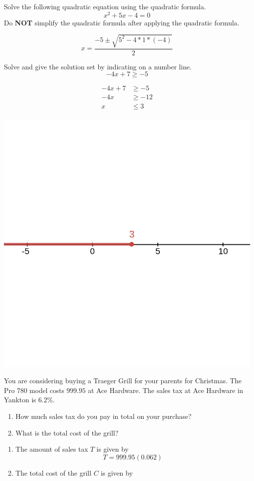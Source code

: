 \documentclass[addpoints,12pt]{exam}
\theoremstyle{definition}
\begin{document}
\begin{questions}
\question Solve the following quadratic equation using the quadratic formula. 
\[
x^{2}+5x - 4 = 0 
\]
Do \textbf{NOT} simplify the quadratic formula after applying the quadratic formula. 
\begin{solution}
    \[
    x = \frac{-5\pm \sqrt{5^{2}-4*1*(-4)}}{2}
    \]
\end{solution}
\question Solve and give the solution set by indicating on a number line. 
\[
-4x + 7 \geq -5 
\]
\begin{solution}
    \begin{align*}
			-4x + 7 & \geq -5 \\
			-4x & \geq -12 \\
			x & \leq 3 \\
    \end{align*}
		\begin{center}
		  \includegraphics[width=0.6\linewidth]{line.png}
			\end{center}
\end{solution}
\question  You are considering buying a Traeger Grill for your parents for Christmas. The Pro 780 model costs $999.95$ at Ace Hardware. The sales tax at Ace Hardware in Yankton is $6.2\%$. 
\begin{enumerate}[label = \alph*)]
	\item How much sales tax do you pay in total on your purchase? 
	\item What is the total cost of the grill? 
\end{enumerate}
\begin{solution}
    \begin{enumerate}[label = \alph*)]
			\item The amount of sales tax $T$ is given by 
				\[
				T = 999.95 (0.062)
				\]
			\item The total cost of the grill $C$ is given by 

\end{enumerate}
\end{solution}
\end{questions}
\end{document}
